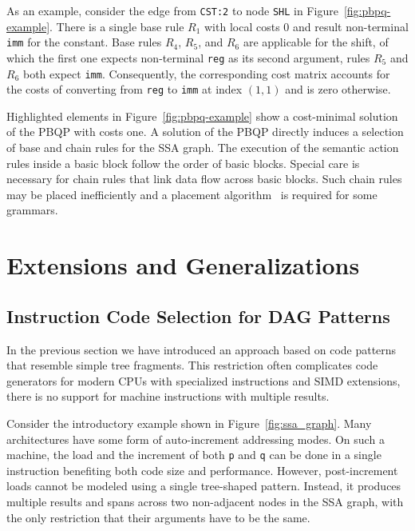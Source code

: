 As an example, consider the edge from \texttt{CST:2} to node
\texttt{SHL} in Figure~\ref{fig:pbpq-example}. There is a single base
rule $R_1$ with local costs 0 and result non-terminal \texttt{imm} for
the constant. Base rules $R_4$, $R_5$, and $R_6$ are applicable for
the shift, of which the first one expects non-terminal \texttt{reg} as
its second argument, rules $R_5$ and $R_6$ both expect
\texttt{imm}. Consequently, the corresponding cost matrix accounts for
the costs of converting from \texttt{reg} to \texttt{imm} at index
$(1,1)$ and is zero otherwise.

Highlighted elements in Figure~\ref{fig:pbpq-example} show a
cost-minimal solution of the PBQP with costs one. A solution of the
PBQP directly induces a selection of base and chain rules for the SSA
graph. The execution of the semantic action rules inside a basic block
follow the order of basic blocks. Special care is necessary for chain rules 
that link data flow across basic blocks. Such chain rules may be placed
inefficiently and a placement algorithm~\cite{1269857} is required for
some grammars. 

\section{Extensions and Generalizations}

\subsection{Instruction Code Selection for DAG Patterns}
\label{sec:dag_patterns}
In the previous section we have introduced an approach based on code
patterns that resemble simple tree fragments. This restriction often
complicates code generators for modern CPUs with specialized
instructions and SIMD extensions, \eg there is no support for
machine instructions with multiple results.

Consider the introductory example shown
in Figure~\ref{fig:ssa_graph}. Many architectures have some form of
auto-increment addressing modes. On such a machine, the load and the
increment of both \texttt{p} and \texttt{q} can be done in a single
instruction benefiting both code size and performance. However,
post-increment loads cannot be modeled using a single tree-shaped
pattern. Instead, it produces multiple results and spans across two
non-adjacent nodes in the SSA graph, with the only restriction that
their arguments have to be the same.

